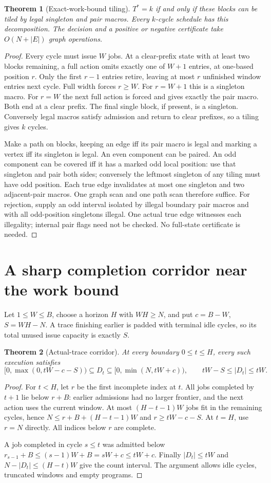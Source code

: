\documentclass[11pt]{article}
\newtheorem{theorem}{Theorem}
\newcommand{\T}{T^*}
\begin{document}
\begin{theorem}[Exact-work-bound tiling]
$\T=k$ if and only if these blocks can be tiled by legal singleton and
pair macros. Every $k$-cycle schedule has this decomposition. The decision
and a positive or negative certificate take $O(N+|E|)$ graph operations.
\end{theorem}
\begin{proof}
Every cycle must issue $W$ jobs. At a clear-prefix state with at least two
blocks remaining, a full action omits exactly one of $W+1$ entries, at
one-based position $r$. Only the first $r-1$ entries retire, leaving at
most $r$ unfinished window entries next cycle. Full width forces $r\ge W$.
For $r=W+1$ this is a singleton macro. For $r=W$ the next full action is
forced and gives exactly the pair macro. Both end at a clear prefix.
The final single block, if present, is a singleton. Conversely legal macros
satisfy admission and return to clear prefixes, so a tiling gives $k$ cycles.

Make a path on blocks, keeping an edge iff its pair macro is legal and
marking a vertex iff its singleton is legal. An even component can be paired.
An odd component can be covered iff it has a marked odd local position:
use that singleton and pair both sides; conversely the leftmost singleton
of any tiling must have odd position. Each true edge invalidates at most
one singleton and two adjacent-pair macros. One graph scan and one path
scan therefore suffice. For rejection, supply an odd interval isolated by
illegal boundary pair macros and with all odd-position singletons illegal.
One actual true edge witnesses each illegality; internal pair flags need
not be checked. No full-state certificate is needed.
\end{proof}

\section{A sharp completion corridor near the work bound}
Let $1\le W\le B$, choose a horizon $H$ with $WH\ge N$, and put
$c=B-W$, $S=WH-N$. A trace finishing earlier is padded with terminal idle
cycles, so its total unused issue capacity is exactly $S$.

\begin{theorem}[Actual-trace corridor]
At every boundary $0\le t\le H$, every such execution satisfies
\[
 [0,\max(0,tW-c-S))\subseteq D_t\subseteq[0,\min(N,tW+c)),
 \qquad tW-S\le |D_t|\le tW.
\]
\end{theorem}
\begin{proof}
For $t<H$, let $r$ be the first incomplete index at $t$. All jobs completed
by $t+1$ lie below $r+B$: earlier admissions had no larger frontier, and
the next action uses the current window. At most $(H-t-1)W$ jobs fit in
the remaining cycles, hence $N\le r+B+(H-t-1)W$ and $r\ge tW-c-S$.
At $t=H$, use $r=N$ directly. All indices below $r$ are complete.

A job completed in cycle $s\le t$ was admitted below
$r_{s-1}+B\le(s-1)W+B=sW+c\le tW+c$.
Finally $|D_t|\le tW$ and $N-|D_t|\le(H-t)W$ give the count interval.
The argument allows idle cycles, truncated windows and empty programs.
\end{proof}
\end{document}
